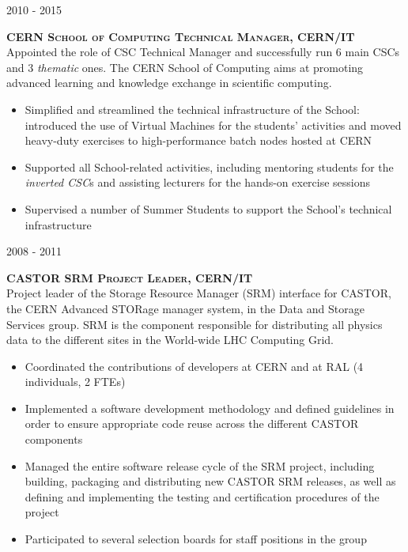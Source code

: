 \documentclass[11pt]{article}
\renewcommand{\subsection}[2]%
        {
         {\bf{\raggedright \scshape #1}}{\bf{\hfill \scshape #2}}\\[-.7\baselineskip]
}
\newenvironment{CompactItemize} {
  \begin{itemize}
  \setlength{\itemsep}{-3pt}
  \setlength{\parsep}{0pt}
  \setlength{\topsep}{-2pt}
  \setlength{\partopsep}{-2pt}
} {\end{itemize}}
\begin{document}
\subsection{2010 - 2015}{CERN School of Computing Technical Manager, CERN/IT}

Appointed the role of CSC Technical Manager and successfully run 6 main CSCs and 3 \emph{thematic} ones. The CERN School of Computing aims at promoting
advanced learning and knowledge exchange in scientific computing.

\begin{CompactItemize}
\item Simplified and streamlined the technical infrastructure of the School: introduced
      the use of Virtual Machines for the students' activities and moved heavy-duty exercises to
      high-performance batch nodes hosted at CERN
\item Supported all School-related activities, including mentoring students for the \emph{inverted CSC}s
      and assisting lecturers for the hands-on exercise sessions
\item Supervised a number of Summer Students to support the School's technical infrastructure
\end{CompactItemize}

\subsection{2008 - 2011}{CASTOR SRM Project Leader, CERN/IT}

Project leader of the Storage Resource Manager (SRM) interface for CASTOR, the CERN Advanced STORage
manager system, in the Data and Storage Services group.
SRM is the component responsible for distributing all physics data to the different sites
in the World-wide LHC Computing Grid.

\begin{CompactItemize}
\item Coordinated the contributions of developers at CERN and at RAL (4 individuals, 2 FTEs)
\item Implemented a software development methodology and defined guidelines in order to ensure
  appropriate code reuse across the different CASTOR components
\item Managed the entire software release cycle of the SRM project, including building, packaging and distributing
  new CASTOR SRM releases, as well as defining and implementing the testing and certification procedures
  of the project
\item Participated to several selection boards for staff positions in the group
\end{CompactItemize}
\end{document}
